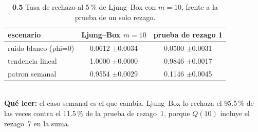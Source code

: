 \begin{table}[htbp]
\centering
\footnotesize
\caption{\textbf{0.5} Tasa de rechazo al 5\,\% de Ljung--Box con $m=10$, frente a la prueba de un solo rezago.}
\label{tab:p0_tabla_ljungbox}
\begin{tabular}{lcc}
\toprule
\textbf{escenario} & \textbf{Ljung--Box $m=10$} & \textbf{prueba de rezago 1} \\
\midrule
ruido blanco (phi=0) & 0.0612 \tiny$\pm$0.0034 & 0.0500 \tiny$\pm$0.0031 \\
tendencia lineal & 1.0000 \tiny$\pm$0.0000 & 0.9846 \tiny$\pm$0.0017 \\
patron semanal & 0.9554 \tiny$\pm$0.0029 & 0.1146 \tiny$\pm$0.0045 \\
\bottomrule
\end{tabular}
\\[0.3em]{\scriptsize \textbf{Qu\'e leer:} el caso semanal es el que cambia. Ljung--Box lo rechaza el 95.5\,\% de las veces contra el 11.5\,\% de la prueba de rezago~1, porque $Q(10)$ incluye el rezago~7 en la suma.}
\end{table}

